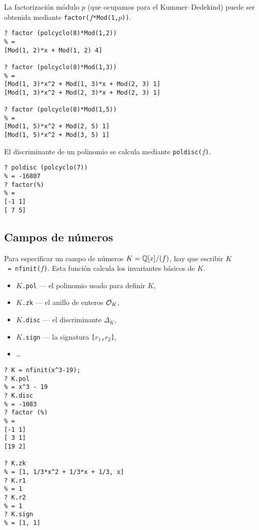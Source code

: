 La factorización módulo $p$ (que ocupamos para el Kummer--Dedekind) puede ser
obtenida mediante \texttt{factor($f$*Mod(1,$p$))}.

\begin{shaded}
\begin{verbatim}
? factor (polcyclo(8)*Mod(1,2))
% = 
[Mod(1, 2)*x + Mod(1, 2) 4]

? factor (polcyclo(8)*Mod(1,3))
% = 
[Mod(1, 3)*x^2 + Mod(1, 3)*x + Mod(2, 3) 1]
[Mod(1, 3)*x^2 + Mod(2, 3)*x + Mod(2, 3) 1]

? factor (polcyclo(8)*Mod(1,5))
% = 
[Mod(1, 5)*x^2 + Mod(2, 5) 1]
[Mod(1, 5)*x^2 + Mod(3, 5) 1]
\end{verbatim}
\end{shaded}

El discriminante de un polinomio se calcula mediante \texttt{poldisc($f$)}.

\begin{shaded}
\begin{verbatim}
? poldisc (polcyclo(7))
% = -16807
? factor(%)
% = 
[-1 1]
[ 7 5]
\end{verbatim}
\end{shaded}


\subsection{Campos de números}

Para especificar un campo de números $K = \mathbb{Q}[x]/(f)$, hay que escribir
\texttt{$K$~=~nfinit($f$)}. Esta función calcula los invariantes básicos de $K$.
\begin{itemize}
\item \texttt{$K$.pol} --- el polinomio usado para definir $K$,
\item \texttt{$K$.zk} --- el anillo de enteros $\mathcal{O}_K$,
\item \texttt{$K$.disc} --- el discriminante $\Delta_K$,
\item \texttt{$K$.sign} --- la signatura \texttt{[$r_1$,$r_2$]},
\item \dots
\end{itemize}

\begin{shaded}
\begin{verbatim}
? K = nfinit(x^3-19);
? K.pol
% = x^3 - 19
? K.disc 
% = -1083
? factor (%)
% = 
[-1 1]
[ 3 1]
[19 2]

? K.zk
% = [1, 1/3*x^2 + 1/3*x + 1/3, x]
? K.r1
% = 1
? K.r2
% = 1
? K.sign
% = [1, 1]
\end{verbatim}
\end{shaded}

